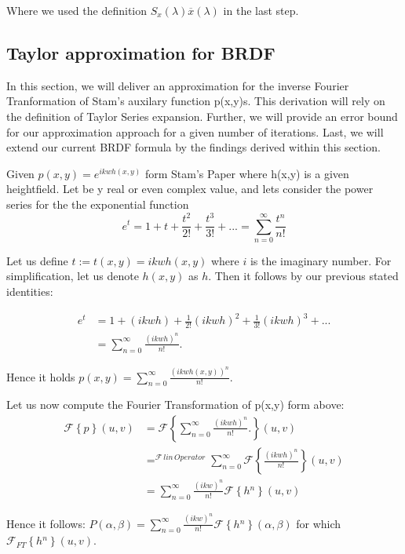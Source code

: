 Where we used the definition $S_x(\lambda)\overline{x}(\lambda)$ in the last step.

\subsection{Taylor approximation for BRDF}
In this section, we will deliver an approximation for the inverse Fourier Tranformation of Stam's auxilary function p(x,y)s. This derivation will rely on the definition of Taylor Series expansion. Further, we will provide an error bound for our approximation approach for a given number of iterations. Last, we will extend our current BRDF formula by the findings derived within this section.

Given $p(x,y)=e^{ikwh(x,y)}$ form Stam's Paper where h(x,y) is a given heightfield. Let be y real or even complex value, and lets consider the power series for the the exponential function 
\begin{equation*}
  e^{t}=1+t+\frac{t^{2}}{2!}+\frac{t^{3}}{3!}+...=\sum_{n=0}^{\infty}\frac{t^{n}}{n!}
\end{equation*}

Let us define $t := t(x,y) = ikwh(x,y)$ where $i$ is the imaginary number.
For simplification, let us denote $h(x,y)$ as $h$. Then it follows by our previous
stated identities: 

\begin{align*}
 e^{t}
 &=1+(ikwh)+\frac{1}{2!}(ikwh)^{2}+\frac{1}{3!}(ikwh)^{3}+... \\
 &=\sum_{n=0}^{\infty}\frac{(ikwh)^{n}}{n!}.
\end{align*}

Hence it holds $p(x,y)=\sum_{n=0}^{\infty}\frac{(ikwh(x,y))^{n}}{n!}.$

Let us now compute the Fourier Transformation of p(x,y) form above:
\begin{align*}
  \mathcal{F}\left\{ p\right\}(u,v)
  & =\mathcal{F}\left\{ \sum_{n=0}^{\infty}\frac{(ikwh)^{n}}{n!}.\right\}(u,v) \\
  & =^{\mathcal{F}\, lin\, Operator}\sum_{n=0}^{\infty}\mathcal{F}\left\{ \frac{(ikwh)^{n}}{n!}\right\}(u,v) \\
  & =\sum_{n=0}^{\infty}\frac{(ikw)^{n}}{n!}\mathcal{F}\left\{ h{}^{n}\right\}(u,v)
\end{align*}

Hence it follows: $P(\alpha,\beta)=\sum_{n=0}^{\infty}\frac{(ikw)^{n}}{n!}\mathcal{F}\left\{ h{}^{n}\right\} (\alpha,\beta)$ for which $\mathcal{F}_{FT}\left\{ h{}^{n}\right\} (u,v)$.

